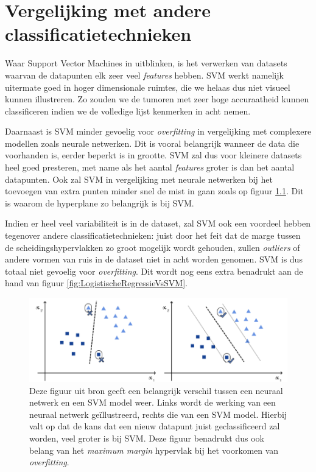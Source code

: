 \documentclass[twoside, kulak]{kulakreport}
\begin{document}
	\chapter{Vergelijking met andere classificatietechnieken}
	
	Waar Support Vector Machines in uitblinken, is het verwerken van datasets waarvan de datapunten elk zeer veel \textit{features} hebben. SVM werkt namelijk uitermate goed in hoger dimensionale ruimtes, die we helaas dus niet visueel kunnen illustreren. Zo zouden we de tumoren met zeer hoge accuraatheid kunnen classificeren indien we de volledige lijst kenmerken in acht nemen.
	
	Daarnaast is SVM minder gevoelig voor \textit{overfitting} in vergelijking met complexere modellen zoals neurale netwerken. Dit is vooral belangrijk wanneer de data die voorhanden is, eerder beperkt is in grootte. SVM zal dus voor kleinere datasets heel goed presteren, met name als het aantal \textit{features} groter is dan het aantal datapunten. Ook zal SVM in vergelijking met neurale netwerken bij het toevoegen van extra punten minder snel de mist in gaan zoals op figuur \ref{fig:NeuralNetsVsSVM}. Dit is waarom de hyperplane zo belangrijk is bij SVM. 
	
	Indien er heel veel variabiliteit is in de dataset, zal SVM ook een voordeel hebben tegenover andere classificatietechnieken: juist door het feit dat de marge tussen de scheidingshypervlakken zo groot mogelijk wordt gehouden, zullen \textit{outliers} of andere vormen van ruis in de dataset niet in acht worden genomen. SVM is dus totaal niet gevoelig voor \textit{overfitting}. Dit wordt nog eens extra benadrukt aan de hand van figuur \ref{fig:LogistischeRegressieVsSVM}.
	
		\begin{figure}
		\centering
		\includegraphics[width=.7\textwidth]{NeuralNets-vs-SVM}
		\caption{Deze figuur uit bron \cite{Luca_2022} geeft een belangrijk verschil tussen een neuraal netwerk en een SVM model weer. Links wordt de werking van een neuraal netwerk geïllustreerd, rechts die van een SVM model. Hierbij valt op dat de kans dat een nieuw datapunt juist geclassificeerd zal worden, veel groter is bij SVM. Deze figuur benadrukt dus ook belang van het \textit{maximum margin} hypervlak bij het voorkomen van \textit{overfitting}. }
		\label{fig:NeuralNetsVsSVM}
	\end{figure}
	
\end{document}
